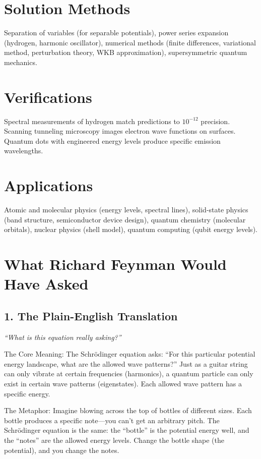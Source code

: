 \section*{Solution Methods}

Separation of variables (for separable potentials), power series expansion (hydrogen, harmonic oscillator), numerical methods (finite differences, variational method, perturbation theory, WKB approximation), supersymmetric quantum mechanics.
\section*{Verifications}

Spectral measurements of hydrogen match predictions to $10^{-12}$ precision. Scanning tunneling microscopy images electron wave functions on surfaces. Quantum dots with engineered energy levels produce specific emission wavelengths.
\section*{Applications}

Atomic and molecular physics (energy levels, spectral lines), solid-state physics (band structure, semiconductor device design), quantum chemistry (molecular orbitals), nuclear physics (shell model), quantum computing (qubit energy levels).
\section*{What Richard Feynman Would Have Asked}

\subsection*{1. The Plain-English Translation}
\textit{``What is this equation really asking?''}

The Core Meaning: The Schr\"odinger equation asks: ``For this particular potential energy landscape, what are the allowed wave patterns?'' Just as a guitar string can only vibrate at certain frequencies (harmonics), a quantum particle can only exist in certain wave patterns (eigenstates). Each allowed wave pattern has a specific energy.

The Metaphor: Imagine blowing across the top of bottles of different sizes. Each bottle produces a specific note---you can't get an arbitrary pitch. The Schr\"odinger equation is the same: the ``bottle'' is the potential energy well, and the ``notes'' are the allowed energy levels. Change the bottle shape (the potential), and you change the notes.

